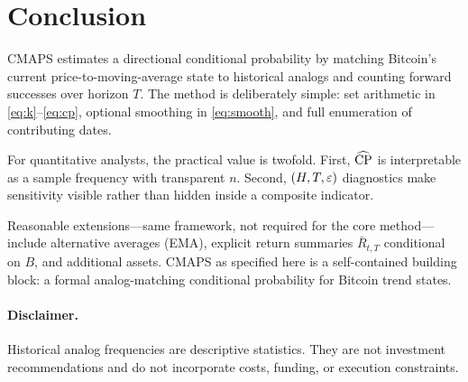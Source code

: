 \section{Conclusion}
\label{sec:conclusion}

CMAPS estimates a directional conditional probability by matching Bitcoin's current price-to-moving-average state to historical analogs and counting forward successes over horizon $T$.
The method is deliberately simple: set arithmetic in \eqref{eq:k}--\eqref{eq:cp}, optional smoothing in \eqref{eq:smooth}, and full enumeration of contributing dates.

For quantitative analysts, the practical value is twofold.
First, $\widehat{\mathrm{CP}}$ is interpretable as a sample frequency with transparent $n$.
Second, $(H,T,\varepsilon)$ diagnostics make sensitivity visible rather than hidden inside a composite indicator.

Reasonable extensions---same framework, not required for the core method---include alternative averages (EMA), explicit return summaries $\bar{R}_{t,T}$ conditional on $B$, and additional assets.
CMAPS as specified here is a self-contained building block: a formal analog-matching conditional probability for Bitcoin trend states.

\paragraph{Disclaimer.}
Historical analog frequencies are descriptive statistics.
They are not investment recommendations and do not incorporate costs, funding, or execution constraints.
